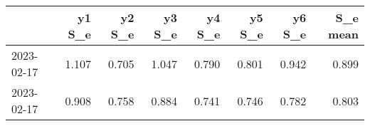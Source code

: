 \begin{tabular}{lrrrrrrr}
\toprule
{} &  y1 S\_e &  y2 S\_e &  y3 S\_e &  y4 S\_e &  y5 S\_e &  y6 S\_e &  S\_e mean \\
\midrule
2023-02-17 &   1.107 &   0.705 &   1.047 &   0.790 &   0.801 &   0.942 &     0.899 \\
2023-02-17 &   0.908 &   0.758 &   0.884 &   0.741 &   0.746 &   0.782 &     0.803 \\
\bottomrule
\end{tabular}
